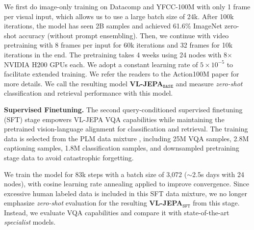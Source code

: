 We first do image-only training on Datacomp and YFCC-100M with only 1 frame per visual input, which allows us to use a large batch size of 24k. After 100k iterations, the model has seen 2B samples and achieved 61.6\% ImageNet zero-shot accuracy (without prompt ensembling). Then, we continue with video pretraining with 8 frames per input for 60k iterations and 32 frames for 10k iterations in the end. The pretraining takes 4 weeks using 24 nodes with 8$\times$NVIDIA H200 GPUs each. We adopt a constant learning rate of $5{\times}10^{-5}$ to facilitate extended training. We refer the readers to the Action100M paper \citep{chen2026action100m} for more details. We call the resulting model \textbf{VL-JEPA$_\texttt{BASE}$} and measure \textit{zero-shot} classification and retrieval performance with this model. 


\textbf{Supervised Finetuning.} The second query-conditioned supervised finetuning (SFT) stage empowers VL-JEPA VQA capabilities while maintaining the pretrained vision-language alignment for classification and retrieval. The training data is selected from the PLM data mixture \citep{cho2025perceptionlm}, including 25M VQA samples, 2.8M captioning samples, 1.8M classification samples, and downsampled pretraining stage data to avoid catastrophic forgetting.

We train the model for 83k steps with a batch size of 3,072 ($\sim$2.5s days with 24 nodes), with cosine learning rate annealing applied to improve convergence. Since excessive human labeled data is included in this SFT data mixture, we no longer emphasize \textit{zero-shot} evaluation for the resulting \textbf{VL-JEPA$_\texttt{SFT}$} from this stage. Instead, we evaluate VQA capabilities and compare it with state-of-the-art \textit{specialist} models.

